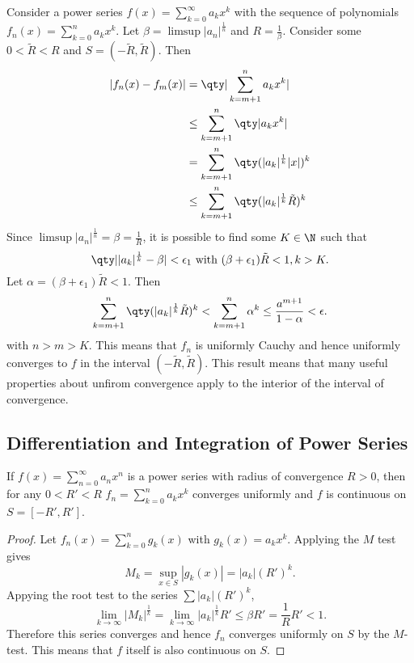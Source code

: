 \documentclass[../notes.tex]{subfiles}
\begin{document}
\begin{example}
    Consider a power series $f(x) = \displaystyle\sum_{k=0}^\infty a_k x^k$ with the sequence of polynomials $f_n(x) = \displaystyle\sum_{k=0}^n a_k x^k$. Let $\beta = \limsup |a_n|^{\frac{1}{n}}$ and $R = \frac{1}{\beta}$. Consider some $0 < \tilde{R} < R$ and $S = (-\tilde{R}, \tilde{R})$. Then
    \begin{align*}
        |f_n(x) - f_m(x)| &= \qty|\sum_{k=m+1}^n a_k x^k| \\
                      &\leq \sum_{k=m+1}^n \qty|a_k x^k| \\
                      &= \sum_{k=m+1}^n \qty(|a_k|^{\frac{1}{k}} |x|)^k \\
                      &\leq \sum_{k=m+1}^n \qty(|a_k|^{\frac{1}{k}} \tilde{R})^k \\
    \end{align*}
    Since $\limsup |a_n|^{\frac{1}{n}} = \beta = \frac{1}{R}$, it is possible to find some $K \in \N$ such that
    \[
        \qty||a_k|^{\frac{1}{k}} - \beta| < \epsilon_1 \text{ with } (\beta + \epsilon_1) \tilde{R} < 1, k > K
    .\]
    Let $\alpha = (\beta + \epsilon_1) \tilde{R} < 1$. Then
    \[
        \sum_{k=m+1}^n \qty(|a_k|^{\frac{1}{k}} \tilde{R})^k < \sum_{k=m+1}^n \alpha^k \leq \frac{a^{m+1}}{1 - \alpha} < \epsilon
    .\]
    with $n > m > K$. This means that $f_n$ is uniformly Cauchy and hence uniformly converges to $f$ in the interval $(-\tilde{R}, \tilde{R})$. This result means that many useful properties about unfirom convergence apply to the interior of the interval of convergence.
\end{example}

\subsection{Differentiation and Integration of Power Series}

\begin{theorem}
    If $f(x) = \displaystyle\sum_{n=0}^\infty a_n x^n$ is a power series with radius of convergence $R > 0$, then for any $0 < R' < R$ $f_n = \displaystyle\sum_{k=0}^n a_k x^k$ converges uniformly and $f$ is continuous on $ S = [-R', R']$.
\end{theorem}

\begin{proof}
    Let $f_n(x) = \displaystyle\sum_{k = 0}^n g_k(x)$ with $g_k(x) = a_k x^k$. Applying the $M$ test gives
    \[
        M_k = \sup_{x\in S} |g_k(x)| = |a_k| (R')^k
    .\]
    Appying the root test to the series $\sum |a_k|(R')^k$,
    \[
        \lim_{k\to \infty} |M_k|^{\frac{1}{k}} = \lim_{k \to \infty} |a_k|^{\frac{1}{k}} R' \leq \beta R' = \frac{1}{R} R' < 1
    .\]
    Therefore this series converges and hence $f_n$ converges uniformly on $S$ by the $M$-test. This means that $f$ itself is also continuous on $S$.
\end{proof}
\end{document}
